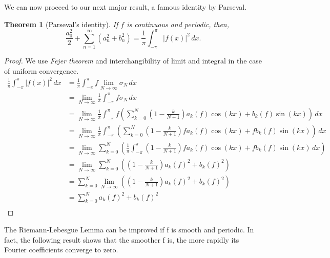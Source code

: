\documentclass[12pt]{amsart}
\newtheorem{theorem}{Theorem}[section]
\theoremstyle{definition}
\begin{document}
We can now proceed to our next major result, a famous identity by Parseval.


\begin{theorem}[Parseval's identity]\footnotemark{}
    If $f$ is continuous and periodic, then,
        \begin{equation}
            \frac{a_0^2}{2} + \sum_{n=1}^{\infty} \left(a_n^2 + b_n^2\right) = \frac{1}{\pi} \int_{-\pi}^{\pi} |f(x)|^2 \, dx.
        \end{equation}
\end{theorem}




\begin{proof}
    We use \textit{Fejer theorem} and interchangibility of limit and integral in the case of uniform convergence.
    \[
    \begin{aligned}
        \frac{1}{\pi} \int_{-\pi}^{\pi} |f(x)|^2 \, dx
        &= \frac{1}{\pi} \int_{-\pi}^{\pi} f\lim_{N \to \infty}\sigma_N \, dx\\
        &= \lim_{N \to \infty}\frac{1}{\pi} \int_{-\pi}^{\pi} f\sigma_N \, dx\\
        &= \lim_{N \to \infty}\frac{1}{\pi} \int_{-\pi}^{\pi} f\left( \sum_{k=0}^{N} (1 - \frac{k}{N+1}) a_k(f)\cos(kx) + b_k(f)\sin(kx) \right)\, dx\\
        &= \lim_{N \to \infty}\frac{1}{\pi} \int_{-\pi}^{\pi} \left( \sum_{k=0}^{N} (1 - \frac{k}{N+1}) fa_k(f)\cos(kx) + fb_k(f)\sin(kx) \right)\, dx\\
        &= \lim_{N \to \infty}  \sum_{k=0}^{N} \left( \frac{1}{\pi} \int_{-\pi}^{\pi}(1 - \frac{k}{N+1}) fa_k(f)\cos(kx) + fb_k(f)\sin(kx)\, dx \right)\\
        &= \lim_{N \to \infty}  \sum_{k=0}^{N} \left((1 - \frac{k}{N+1}) a_k(f)^2 + b_k(f)^2 \right)\\
        &=   \sum_{k=0}^{N} \lim_{N \to \infty}\left((1 - \frac{k}{N+1}) a_k(f)^2 + b_k(f)^2 \right)\\\
        &=   \sum_{k=0}^{N}  a_k(f)^2 + b_k(f)^2 \\
    \end{aligned}
    \]
\end{proof}


The Riemann-Lebesgue Lemma can be improved if f is smooth and periodic. In
fact, the following result shows that the smoother f is, the more rapidly its Fourier
coefficients converge to zero.
\end{document}
